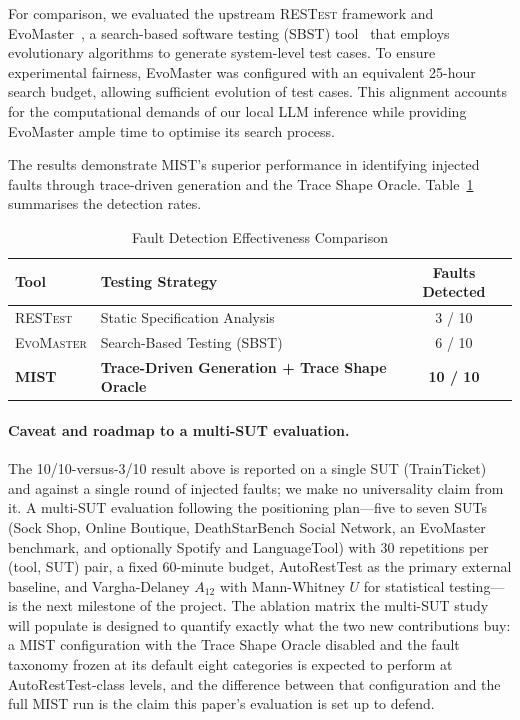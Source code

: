 \documentclass[conference]{IEEEtran}
\begin{document}
For comparison, we evaluated the upstream \textsc{RESTest} framework
and EvoMaster~\cite{Arcuri2020}, a search-based software testing
(SBST) tool~\cite{harman2001search} that employs evolutionary
algorithms to generate system-level test cases. To ensure experimental
fairness, EvoMaster was configured with an equivalent 25-hour search
budget, allowing sufficient evolution of test cases. This alignment
accounts for the computational demands of our local LLM inference
while providing EvoMaster ample time to optimise its search process.

The results demonstrate \textsc{MIST}'s superior performance in identifying injected faults through trace-driven generation and the Trace Shape Oracle. Table~\ref{tab:fault_comparison} summarises the detection rates.



\begin{table}[h]
\centering
\caption{Fault Detection Effectiveness Comparison}
\label{tab:fault_comparison}
\begin{tabularx}{\columnwidth}{l X c}
\toprule
\textbf{Tool} & \textbf{Testing Strategy} & \textbf{Faults Detected} \\
\midrule
\textsc{RESTest} & Static Specification Analysis & 3 / 10 \\
\textsc{EvoMaster} & Search-Based Testing (SBST) & 6 / 10 \\
\textbf{\textsc{MIST}} & \textbf{Trace-Driven Generation + Trace Shape Oracle} & \textbf{10 / 10} \\
\bottomrule
\end{tabularx}
\end{table}

\paragraph{Caveat and roadmap to a multi-SUT evaluation.}
The 10/10-versus-3/10 result above is reported on a single SUT
(TrainTicket) and against a single round of injected faults; we make no
universality claim from it.  A multi-SUT evaluation following the
positioning plan---five to seven SUTs (Sock Shop, Online Boutique,
DeathStarBench Social Network, an EvoMaster benchmark, and optionally
Spotify and LanguageTool) with 30 repetitions per (tool, SUT) pair, a
fixed 60-minute budget, AutoRestTest as the primary external baseline,
and Vargha-Delaney $A_{12}$ with Mann-Whitney $U$ for statistical
testing---is the next milestone of the project.  The ablation matrix
the multi-SUT study will populate is designed to quantify exactly what
the two new contributions buy: a \textsc{MIST} configuration with the
Trace Shape Oracle disabled and the fault taxonomy frozen at its
default eight categories is expected to perform at AutoRestTest-class
levels, and the difference between that configuration and the full
\textsc{MIST} run is the claim this paper's evaluation is set up to
defend.



\end{document}
